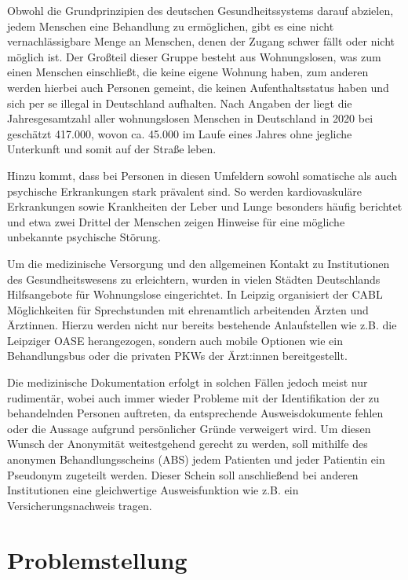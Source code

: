 Obwohl die Grundprinzipien des deutschen Gesundheitssystems darauf abzielen, jedem Menschen eine Behandlung zu ermöglichen, gibt es eine nicht vernachlässigbare Menge an Menschen, denen der Zugang schwer fällt oder nicht möglich ist. Der Großteil dieser Gruppe besteht aus Wohnungslosen, was zum einen Menschen einschließt, die keine eigene Wohnung haben, zum anderen werden hierbei auch Personen gemeint, die keinen Aufenthaltsstatus haben und sich per se illegal in Deutschland aufhalten. Nach Angaben der \citet{BAGWohnungslosenhilfe.2021} liegt die Jahresgesamtzahl aller wohnungslosen Menschen in Deutschland in 2020 bei geschätzt 417.000, wovon ca. 45.000 im Laufe eines Jahres ohne jegliche Unterkunft und somit auf der Straße leben.

Hinzu kommt, dass bei Personen in diesen Umfeldern sowohl somatische als auch psychische Erkrankungen stark prävalent sind. So werden kardiovaskuläre Erkrankungen sowie Krankheiten der Leber und Lunge besonders häufig berichtet und etwa zwei Drittel der Menschen zeigen Hinweise für eine mögliche unbekannte psychische Störung. \citep{DAE228829}

Um die medizinische Versorgung und den allgemeinen Kontakt zu Institutionen des Gesundheitswesens zu erleichtern, wurden in vielen Städten Deutschlands Hilfsangebote für Wohnungslose eingerichtet. In Leipzig organisiert der \ac{CABL} Möglichkeiten für Sprechstunden mit ehrenamtlich arbeitenden Ärzten und Ärztinnen. Hierzu werden nicht nur bereits bestehende Anlaufstellen wie z.B. die Leipziger OASE herangezogen, sondern auch mobile Optionen wie ein Behandlungsbus oder die privaten PKWs der Ärzt:innen bereitgestellt.

Die medizinische Dokumentation erfolgt in solchen Fällen jedoch meist nur rudimentär, wobei auch immer wieder Probleme mit der Identifikation der zu behandelnden Personen auftreten, da entsprechende Ausweisdokumente fehlen oder die Aussage aufgrund persönlicher Gründe verweigert wird. Um diesen Wunsch der Anonymität weitestgehend gerecht zu werden, soll mithilfe des anonymen Behandlungsscheins (\acs{ABS}) jedem Patienten und jeder Patientin ein Pseudonym zugeteilt werden. Dieser Schein soll anschließend bei anderen Institutionen eine gleichwertige Ausweisfunktion wie z.B. ein Versicherungsnachweis tragen. \citep[vgl.]{CABL}


\section{Problemstellung}

